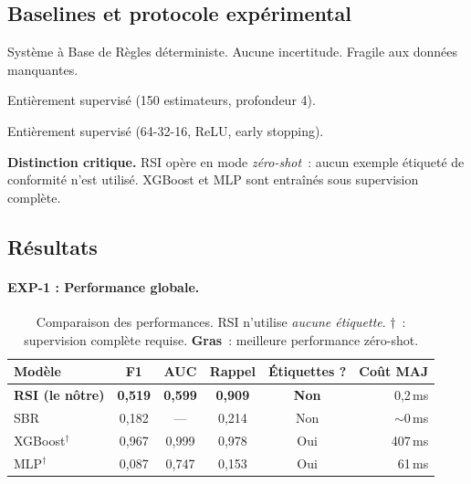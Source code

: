 \documentclass[letterpaper]{article}
\begin{document}
\subsection{Baselines et protocole exp\'erimental}

\begin{description}[leftmargin=1.5em]
  \item[SBR] Syst\`eme \`a Base de R\`egles d\'eterministe. Aucune
        incertitude. Fragile aux donn\'ees manquantes.
  \item[XGBoost] \citep{chen2016xgboost} Enti\`erement supervis\'e
        (150 estimateurs, profondeur 4).
  \item[MLP] Enti\`erement supervis\'e (64-32-16, ReLU, early stopping).
\end{description}

\noindent\textbf{Distinction critique.} RSI op\`ere en mode
\emph{z\'ero-shot}~: aucun exemple \'etiquet\'e de conformit\'e n'est
utilis\'e. XGBoost et MLP sont entra\^in\'es sous supervision compl\`ete.

\subsection{R\'esultats}

\paragraph{EXP-1 : Performance globale.}

\begin{table}[H]
\centering
\caption{Comparaison des performances. RSI n'utilise \emph{aucune \'etiquette}.
         $\dagger$~: supervision compl\`ete requise.
         \textbf{Gras}~: meilleure performance z\'ero-shot.}
\label{tab:main}
\renewcommand{\arraystretch}{1.2}
\begin{tabular}{lccccr}
\toprule
\textbf{Mod\`ele} & \textbf{F1} & \textbf{AUC} & \textbf{Rappel}
  & \textbf{\'Etiquettes ?} & \textbf{Co\^ut MAJ} \\
\midrule
\textbf{RSI (le n\^otre)} & \textbf{0,519} & \textbf{0,599} & \textbf{0,909}
  & \textbf{Non} & 0,2\,ms \\
SBR & 0,182 & --- & 0,214 & Non & $\sim$0\,ms \\
XGBoost$^\dagger$ & 0,967 & 0,999 & 0,978 & Oui & 407\,ms \\
MLP$^\dagger$ & 0,087 & 0,747 & 0,153 & Oui & 61\,ms \\
\bottomrule
\end{tabular}
\end{table}
\end{document}
